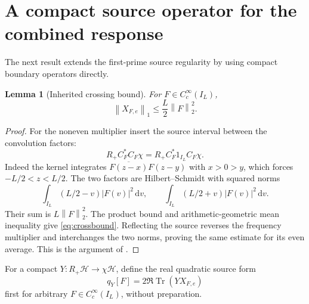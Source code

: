 \documentclass[11pt]{article}
\newtheorem{lemma}[theorem]{Lemma}
\theoremstyle{remark}
\newcommand{\HH}{\mathcal H}
\newcommand{\norm}[1]{\left\lVert#1\right\rVert}
\newcommand{\dd}{\,\mathrm d}
\DeclareMathOperator{\Tr}{Tr}
\numberwithin{equation}{section}
\begin{document}
\section{A compact source operator for the combined response}\label{sec:compact}

The next result extends the first-prime source regularity
\cite{closed,compact} by using compact boundary operators directly.

\begin{lemma}[Inherited crossing bound]\label{lem:cross}
For \(F\in C_c^\infty(I_L)\),
\begin{equation}\label{eq:crossbound}
 \norm{X_{F,e}}_1\le\frac L2\norm F_2^2.
\end{equation}
\end{lemma}
\begin{proof}
For the noneven multiplier insert the source interval between the
convolution factors:
\[
 R_+C_F^*C_F\chi=R_+C_F^*1_{I_L}C_F\chi.
\]
Indeed the kernel integrates
\(\overline{F(z-x)}F(z-y)\) with \(x>0>y\), which forces
\(-L/2<z<L/2\). The two factors are Hilbert--Schmidt with squared norms
\[
 \int_{I_L}(L/2-v)|F(v)|^2\dd v,\qquad
 \int_{I_L}(L/2+v)|F(v)|^2\dd v.
\]
Their sum is \(L\norm F_2^2\). The product bound and arithmetic-geometric
mean inequality give \eqref{eq:crossbound}. Reflecting the source reverses
the frequency multiplier and interchanges the two norms, proving the
same estimate for its even average. This is the argument of
\cite[Section 2]{closed}.
\end{proof}

For a compact \(Y:R_+\HH\to\chi\HH\), define the real quadratic source form
\[
 q_Y[F]=2\Re\Tr(YX_{F,e})
\]
first for arbitrary \(F\in C_c^\infty(I_L)\), without preparation.
\end{document}
